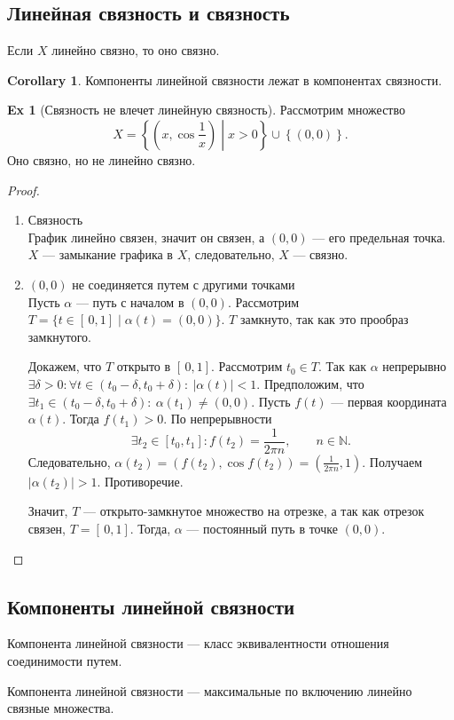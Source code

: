 \documentclass[11pt]{book}
\newcommand{\N}{\mathbb{N}}
\theoremstyle{definition}
\theoremstyle{plain}
\theoremstyle{plain}
\theoremstyle{definition}
\newtheorem*{ex}{Ex}
\newtheorem*{cor}{Corollary}
\theoremstyle{remark}
\begin{document}
\subsection{Линейная связность и связность}
\begin{thm}
    Если $ X$ линейно связно, то оно связно.
\end{thm}
\begin{cor}
    Компоненты линейной связности лежат  в компонентах связности.
\end{cor}
\begin{ex}[Связность не влечет линейную связность]
    Рассмотрим множество
    \[
X = 	\left\{ \left(  x, \cos \frac{1}{x} \right) \middle| x>0 \right\} \cup \left\{ (0, 0) \right\}
    .\]
    Оно связно, но не линейно связно.
\end{ex}
\begin{proof}
    $ $
    \begin{enumerate}
	\item Связность \\
	    График линейно связен, значит он связен, а $ (0, 0)$ --- его предельная точка.  $ X$ --- замыкание графика в $ X$, следовательно,  $ X$ --- связно.
	\item $ (0, 0)$ не соединяется путем с другими точками \\
	    Пусть $ \alpha $ --- путь с началом в $ (0, 0)$.
	    Рассмотрим $ T = \{t \in [\,0, 1] \mid \alpha (t) = (0,0)\}$.
	    $ T$ замкнуто, так как это прообраз замкнутого.

	    Докажем, что  $ T$ открыто в  $[\,0, 1]$.
	    Рассмотрим $ t_0 \in  T$. Так как $ \alpha $ непрерывно $ \exists  \delta >0: \forall t \in  (t_0 - \delta , t_0 + \delta ) : ~ | \alpha (t) | <1$. Предположим, что $ \exists t_1 \in  (t_0 - \delta , t_0 + \delta ) : ~ \alpha (t_1) \ne (0, 0)$.
	    Пусть  $ f(t)$ --- первая координата  $ \alpha (t)$.
	    Тогда $ f(t_1) > 0$. По непрерывности
	    \[
		\exists t_2 \in  [t_0, t_1] : f(t_2) = \frac{1}{2 \pi n}, \qquad  n \in  \N
	    .\]
	    Следовательно, $ \alpha (t_2) = (f(t_2), \cos f(t_2)) = \left( \frac{1}{2 \pi n}, 1 \right) $. Получаем $ | \alpha (t_2)| > 1$. Противоречие.

	    Значит, $ T$ --- открыто-замкнутое множество на отрезке, а так как отрезок связен,  $ T = [\,0, 1]$. Тогда,  $ \alpha $ --- постоянный путь в точке $ (0, 0)$.
    \end{enumerate}
\end{proof}
\subsection{Компоненты линейной связности}
\begin{defn}
    {\sf Компонента линейной связности} --- класс эквивалентности отношения соединимости путем.
\end{defn}
\begin{defn}[переформулировка]
    Компонента линейной связности --- максимальные по включению линейно связные множества.
\end{defn}
\end{document}
